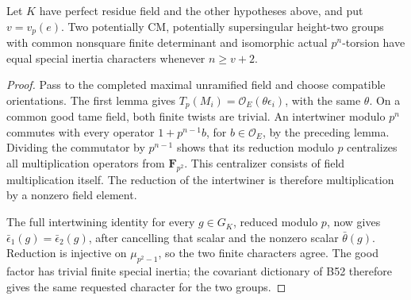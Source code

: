 \begin{proposition}
\label{prop:B-RD78-CM}
Let \(K\) have perfect residue field and the other hypotheses
above, and put \(v=v_p(e)\). Two potentially CM, potentially
supersingular height-two groups with common nonsquare finite
determinant and isomorphic actual \(p^n\)-torsion have equal
special inertia characters whenever \(n\ge v+2\).
\end{proposition}
\begin{proof}
Pass to the completed maximal unramified field and choose
compatible orientations. The first lemma gives
\(T_p(M_i)=\mathcal O_E(\theta\epsilon_i)\), with the same
\(\theta\). On a common good tame field, both finite twists
are trivial. An intertwiner modulo \(p^n\) commutes with every
operator \(1+p^{n-1}b\), for \(b\in\mathcal O_E\), by the
preceding lemma. Dividing the commutator by \(p^{n-1}\) shows
that its reduction modulo \(p\) centralizes all multiplication
operators from \(\mathbf F_{p^2}\). This centralizer consists
of field multiplication itself. The reduction of the intertwiner
is therefore multiplication by a nonzero field element.

The full intertwining identity for every \(g\in G_K\), reduced
modulo \(p\), now gives
\(\bar\epsilon_1(g)=\bar\epsilon_2(g)\), after cancelling
that scalar and the nonzero scalar \(\bar\theta(g)\).
Reduction is injective on \(\mu_{p^2-1}\), so the two finite
characters agree. The good factor has trivial finite special
inertia; the covariant dictionary of B52 therefore gives the
same requested character for the two groups.
\end{proof}

